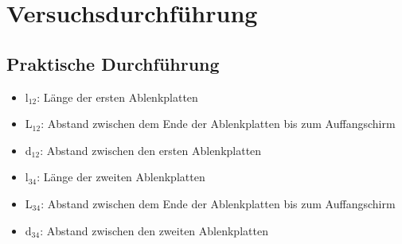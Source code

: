 \documentclass[12pt]{scrartcl}
\begin{document}
\section{Versuchsdurchführung}


\subsection{Praktische Durchführung}

\begin{itemize}
\item	l$_{12}$:	Länge der ersten Ablenkplatten
\item	L$_{12}$:	Abstand zwischen dem Ende der Ablenkplatten bis zum Auffangschirm
\item	d$_{12}$:	Abstand zwischen den ersten Ablenkplatten
\item	l$_{34}$:	Länge der zweiten Ablenkplatten
\item	L$_{34}$:	Abstand zwischen dem Ende der Ablenkplatten bis zum Auffangschirm
\item	d$_{34}$:	Abstand zwischen den zweiten Ablenkplatten
\end{itemize}
\end{document}
